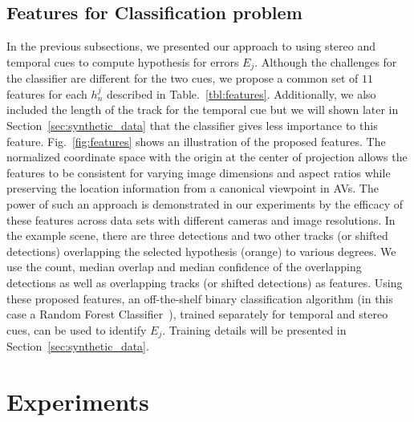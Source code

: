 \documentclass[letterpaper, 10 pt, journal, twoside]{IEEEtran}  %
\begin{document}
\subsection{Features for Classification problem}
\label{subsec:feature_description}
 In the previous subsections, we presented our approach to using stereo and temporal cues to compute hypothesis for errors $E_j$. Although the challenges for the classifier are different for the two cues, we propose a common set of $11$ features for each $h_n^j$ described in Table.~\ref{tbl:features}. Additionally, we also included the length of the track for the temporal cue but we will shown later in Section~\ref{sec:synthetic_data} that the classifier gives less importance to this feature. Fig.~\ref{fig:features} shows an illustration of the proposed features. The normalized coordinate space with the origin at the center of projection allows the features to be consistent for varying image dimensions and aspect ratios while preserving the location information from a canonical viewpoint in AVs. The power of such an approach is demonstrated in our experiments by the efficacy of these features across data sets with different cameras and image resolutions. In the example scene, there are three detections and two other tracks (or shifted detections) overlapping the selected hypothesis (orange) to various degrees. We use the count, median overlap and median confidence of the overlapping detections as well as overlapping tracks (or shifted detections) as features. Using these proposed features, an off-the-shelf binary classification algorithm (in this case a Random Forest Classifier~\cite{breiman2001random}), trained separately for temporal and stereo cues, can be used to identify $E_j$. Training details will be presented in Section~\ref{sec:synthetic_data}.


\section{Experiments}
\label{sec:result}
\end{document}
